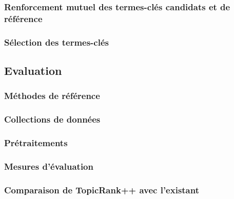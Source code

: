       \subsubsection{Renforcement mutuel des termes-clés candidats et de référence}
      \label{subsubsec:main-automatic_keyphrase_annotation-supervised_automatic_keyphrase_extraction-topicrank++-mutual_reinforcement}

      \subsubsection{Sélection des termes-clés}
      \label{subsubsec:main-automatic_keyphrase_annotation-supervised_automatic_keyphrase_extraction-topicrank++-keyphrase_selection}

    \subsection{Evaluation}
    \label{subsec:main-automatic_keyphrase_annotation-supervised_automatic_keyphrase_annotation-evaluation}
      \subsubsection{Méthodes de référence}
      \label{subsubsec:main-automatic_keyphrase_annotation-supervised_automatic_keyphrase_annotation-evaluation-baselines}

      \subsubsection{Collections de données}
      \label{subsubsec:main-automatic_keyphrase_annotation-supervised_automatic_keyphrase_annotation-evaluation-evaluation_data}

      \subsubsection{Prétraitements}
      \label{subsubsec:main-automatic_keyphrase_annotation-supervised_automatic_keyphrase_annotation-evaluation-preprocessing}
      
      \subsubsection{Mesures d'évaluation}
      \label{subsubsec:main-automatic_keyphrase_annotation-supervised_automatic_keyphrase_annotation-evaluation-evaluation_measures}
      
      \subsubsection{Comparaison de TopicRank++ avec l'existant}
      \label{subsubsec:main-automatic_keyphrase_annotation-supervised_automatic_keyphrase_annotation-evaluation-comparison}

